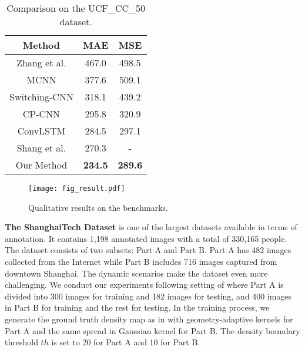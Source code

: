 \documentclass[journal]{IEEEtran}
\begin{document}
\begin{table}
\begin{center}
\caption{Comparison on the UCF\_CC\_50 dataset.}
\label{tab:ucf}
\begin{tabular}{c|cc }
\hline
Method &MAE&MSE\\
  \hline
  \hline
  Zhang et al. \cite{Zhang:2015id} &	 467.0  &  498.5    \\
  \hline
  MCNN \cite{Zhang:2016fr} &	377.6   &  509.1   \\
  \hline
  Switching-CNN \cite{sam2017switching} &	318.1   & 439.2    \\
  \hline

  CP-CNN \cite{Sindagi:2017vv} &	295.8 &  320.9   \\
  \hline
  ConvLSTM \cite{Xiong:2017ug}  &	284.5   &  297.1  \\
  \hline
  Shang et al. \cite{Shang:2016iq}  &	270.3   &   -  \\
  \hline
  Our Method   &	\textbf{234.5}   &  \textbf{289.6}   \\
  \hline
\end{tabular}
\end{center}
\vspace{-0.15in}
\end{table}

\begin{figure*}[t]
  \centering
  \texttt{[image: fig\_result.pdf]}
  \caption{Qualitative results on the benchmarks.}
  \label{fig:further_results}
\vspace{-0.15in}
\end{figure*}

\vspace{0.05in}\noindent \textbf{The ShanghaiTech Dataset} \cite{Zhang:2016fr} is one of the largest datasets available in terms of annotation. It contains 1,198 annotated images with a total of 330,165 people. The dataset consists of two subsets: Part A and Part B. Part A has 482 images collected from the Internet while Part B includes 716 images captured from downtown Shanghai. The dynamic scenarios make the dataset even more challenging. We conduct our experiments following setting of \cite{Zhang:2016fr} where Part A is divided into 300 images for training and 182 images for testing, and 400 images in Part B for training and the rest for testing. In the training process, we generate the ground truth density map as in \cite{Zhang:2016fr} with geometry-adaptive kernels for Part A and the same spread in Gaussian kernel for Part B. The density boundary threshold $th$ is set to 20 for Part A and 10 for Part B.
\end{document}

